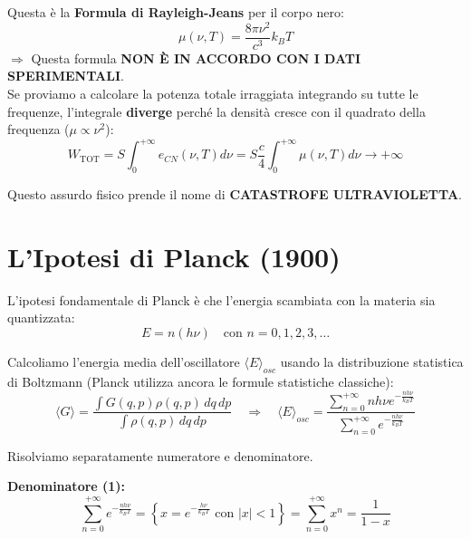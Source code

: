 \documentclass[11pt, a4paper]{article}
\begin{document}
Questa è la \textbf{Formula di Rayleigh-Jeans} per il corpo nero: %
\begin{equation}
    \boxed{ \mu(\nu, T) = \frac{8\pi \nu^2}{c^3} k_B T }
\end{equation} %
$\Rightarrow$ Questa formula \textbf{NON È IN ACCORDO CON I DATI SPERIMENTALI}. \\

\noindent
Se proviamo a calcolare la potenza totale irraggiata integrando su tutte le frequenze, l'integrale \textbf{diverge} perché la densità cresce con il quadrato della frequenza ($\mu \propto \nu^2$): %
\begin{equation}
    W_{\text{TOT}} = S \int_0^{+\infty} e_{CN}(\nu, T) d\nu = S \frac{c}{4} \int_0^{+\infty} \mu(\nu, T) d\nu \rightarrow +\infty
\end{equation} %

Questo assurdo fisico prende il nome di \textbf{CATASTROFE ULTRAVIOLETTA}. \\

\section{L'Ipotesi di Planck (1900)} %

L'ipotesi fondamentale di Planck è che l'energia scambiata con la materia sia quantizzata: %
\begin{equation}
    \boxed{ E = n(h\nu) } \quad \text{con } n = 0, 1, 2, 3, \dots %
\end{equation}

\noindent
Calcoliamo l'energia media dell'oscillatore $\langle E \rangle_{osc}$ usando la distribuzione statistica di Boltzmann (Planck utilizza ancora le formule statistiche classiche): %
\begin{equation*}
    \langle G \rangle = \frac{\int G(q,p) \rho(q,p) \, dq \, dp}{\int \rho(q,p) \, dq \, dp} \quad \Rightarrow \quad \langle E \rangle_{osc} = \frac{\sum_{n=0}^{+\infty} n h \nu e^{-\frac{n h \nu}{k_B T}}}{\sum_{n=0}^{+\infty} e^{-\frac{n h \nu}{k_B T}}} %
\end{equation*}


Risolviamo separatamente numeratore e denominatore. 

\textbf{Denominatore (1):} %
\begin{equation*}
    \sum_{n=0}^{+\infty} e^{-\frac{n h \nu}{k_B T}} = \left\{ x = e^{-\frac{h \nu}{k_B T}} \text{ con } |x| < 1 \right\} = \sum_{n=0}^{+\infty} x^n = \frac{1}{1-x} %
\end{equation*}
\end{document}
